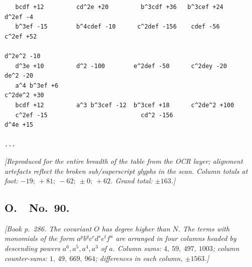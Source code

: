 \documentclass[11pt]{article}
\begin{document}
\begin{small}
\begin{verbatim}
   bcdf +12         cd^2e +20         b^3cdf +36   b^3cef +24             d^2ef -4
   b^3ef -15        b^4cdef -10      c^2def -156    cdef -56              c^2ef +52
                                                                          d^2e^2 -10
   d^3e +10         d^2 -100        e^2def -50      c^2dey -20            de^2 -20
   a^4 b^3ef +6                                                            c^2de^2 +30
   bcdf +12         a^3 b^3cef -12  b^3cef +18      c^2de^2 +100
   c^2ef -15                          cd^2 -156                            d^4e +15
                                                                                                ...
\end{verbatim}
\end{small}

\textit{[Reproduced for the entire breadth of the table from the OCR layer; alignment artefacts reflect the broken sub/superscript glyphs in the scan. Column totals at foot: $-19;\ +81;\ -62;\ \pm 0;\ +62$. Grand total: $\pm 163$.]}

\bigskip

\subsection*{O.\ \ No.\ 90.}

\textit{[Book p.~286. The covariant $O$ has degree higher than $N$. The terms with monomials of the form $a^p b^q c^r d^s e^t f^u$ are arranged in four columns headed by descending powers $a^6, a^5, a^4, a^3$ of $a$. Column sums: $4,\ 59,\ 497,\ 1003$; column counter-sums: $1,\ 49,\ 669,\ 964$; differences in each column, $\pm 1563$.]}

\smallskip
\end{document}
